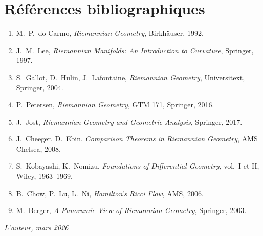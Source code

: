 \section*{R\'ef\'erences bibliographiques}

\begin{enumerate}
    \item M.~P.~do Carmo, \emph{Riemannian Geometry}, Birkh\"auser, 1992.
    \item J.~M.~Lee, \emph{Riemannian Manifolds: An Introduction to Curvature},
          Springer, 1997.
    \item S.~Gallot, D.~Hulin, J.~Lafontaine, \emph{Riemannian Geometry},
          Universitext, Springer, 2004.
    \item P.~Petersen, \emph{Riemannian Geometry}, GTM 171, Springer, 2016.
    \item J.~Jost, \emph{Riemannian Geometry and Geometric Analysis}, Springer, 2017.
    \item J.~Cheeger, D.~Ebin, \emph{Comparison Theorems in Riemannian Geometry},
          AMS Chelsea, 2008.
    \item S.~Kobayashi, K.~Nomizu, \emph{Foundations of Differential Geometry},
          vol.~I et II, Wiley, 1963--1969.
    \item B.~Chow, P.~Lu, L.~Ni, \emph{Hamilton's Ricci Flow}, AMS, 2006.
    \item M.~Berger, \emph{A Panoramic View of Riemannian Geometry}, Springer, 2003.
\end{enumerate}

\bigskip
\hfill\emph{L'auteur, mars 2026}
